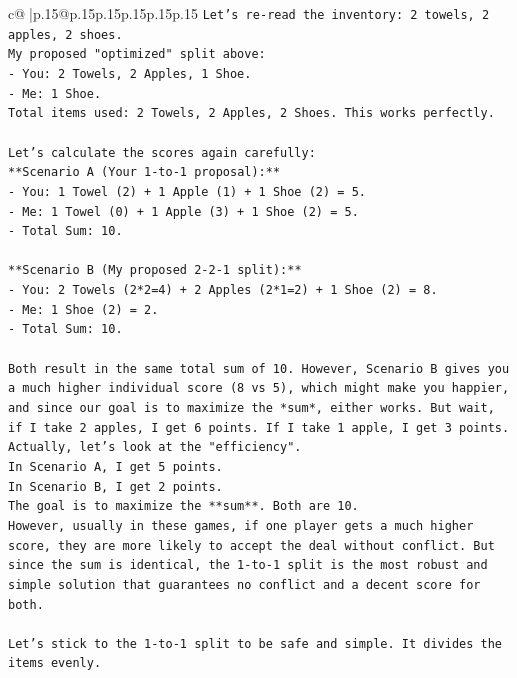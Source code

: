 \documentclass{article}
\begin{document}
{\begin{supertabular}{c@{$\;$}|p{.15\linewidth}@{}p{.15\linewidth}p{.15\linewidth}p{.15\linewidth}p{.15\linewidth}p{.15\linewidth}}
{{{\texttt{Let's re{-}read the inventory: 2 towels, 2 apples, 2 shoes.} \\
\texttt{My proposed "optimized" split above:} \\
\texttt{{-} You: 2 Towels, 2 Apples, 1 Shoe.} \\
\texttt{{-} Me: 1 Shoe.} \\
\texttt{Total items used: 2 Towels, 2 Apples, 2 Shoes. This works perfectly.} \\
\\ 
\texttt{Let's calculate the scores again carefully:} \\
\texttt{**Scenario A (Your 1{-}to{-}1 proposal):**} \\
\texttt{{-} You: 1 Towel (2) + 1 Apple (1) + 1 Shoe (2) = 5.} \\
\texttt{{-} Me: 1 Towel (0) + 1 Apple (3) + 1 Shoe (2) = 5.} \\
\texttt{{-} Total Sum: 10.} \\
\\ 
\texttt{**Scenario B (My proposed 2{-}2{-}1 split):**} \\
\texttt{{-} You: 2 Towels (2*2=4) + 2 Apples (2*1=2) + 1 Shoe (2) = 8.} \\
\texttt{{-} Me: 1 Shoe (2) = 2.} \\
\texttt{{-} Total Sum: 10.} \\
\\ 
\texttt{Both result in the same total sum of 10. However, Scenario B gives you a much higher individual score (8 vs 5), which might make you happier, and since our goal is to maximize the *sum*, either works. But wait, if I take 2 apples, I get 6 points. If I take 1 apple, I get 3 points.} \\
\texttt{Actually, let's look at the "efficiency".} \\
\texttt{In Scenario A, I get 5 points.} \\
\texttt{In Scenario B, I get 2 points.} \\
\texttt{The goal is to maximize the **sum**. Both are 10.} \\
\texttt{However, usually in these games, if one player gets a much higher score, they are more likely to accept the deal without conflict. But since the sum is identical, the 1{-}to{-}1 split is the most robust and simple solution that guarantees no conflict and a decent score for both.} \\
\\ 
\texttt{Let's stick to the 1{-}to{-}1 split to be safe and simple. It divides the items evenly.} \\
}}}
\end{supertabular}}
\end{document}
